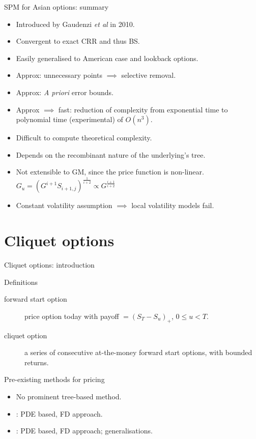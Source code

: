 \documentclass[utf8,t,xcolor=svgnames]{beamer}
\newcommand\pro{\item[\textbf{\CheckedBox}]}
\newcommand\con{\item[\textbf{\XBox}]}
\newcommand\neu{\item[\textbf{\Square}]}
\begin{document}
\begin{frame}{SPM for Asian options: summary}
	\begin{itemize}
		\neu Introduced by Gaudenzi \emph{et al} \cite{Gaudenzi2010} in 2010.
		\pro Convergent to exact CRR and thus BS.
		\pro Easily generalised to American case and lookback options.
		\pro Approx: unnecessary points $ \implies $ selective removal.
		\pro Approx: \emph{A priori} error bounds.
		\pro Approx $ \implies $ fast: reduction of complexity from exponential time to polynomial time (experimental) of $ O(n^3) $.
		\con Difficult to compute theoretical complexity.
		\con Depends on the recombinant nature of the underlying's tree.
		\con<alert@1-> Not extensible to GM, since the price function is non-linear. $ G_u = \left( G^{i+1} S_{i+1,j} \right)^{\frac{1}{i+2}} \propto G^{\frac{i+1}{i+2}} $
		\con<alert@1-> Constant volatility assumption $ \implies $ local volatility models fail.
	\end{itemize}
\end{frame}



\section{Cliquet options}

\begin{frame}{Cliquet options: introduction}
	\begin{block}{Definitions}
		\begin{description}
			\item[forward start option] price option today with payoff $ = (S_T - S_u)_+ $, $ 0 \le u < T $.
			\item[cliquet option] a series of consecutive at-the-money forward start options, with bounded returns.
		\end{description}
	\end{block}
	\begin{block}{Pre-existing methods for pricing}
		\begin{itemize}
			\item No prominent tree-based method.
			\item \cite{Wilmott2002}: PDE based, FD approach.
			\item \cite{Windcliff2006}: PDE based, FD approach; generalisations.
		\end{itemize}
	\end{block}
\end{frame}
\end{document}
